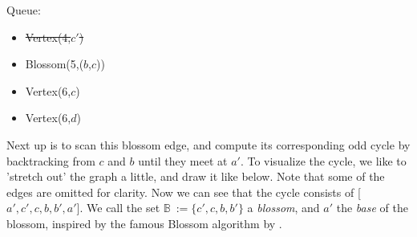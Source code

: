 \begin{minipage}{.75\linewidth}
\end{minipage}\hfill%
\begin{minipage}{.26\linewidth}
    Queue:
    \begin{itemize}
        \item \st{Vertex(4,$c'$)}
        \item Blossom(5,($b$,$c$))
        \item Vertex(6,$c$)
        \item Vertex(6,$d$)
    \end{itemize}
\end{minipage}

Next up is to scan this blossom edge, and compute its corresponding odd cycle by backtracking from $c$ and $b$ until they meet at $a'$. To visualize the cycle, we like to 'stretch out' the graph a little, and draw it like below. Note that some of the edges are omitted for clarity. Now we can see that the cycle consists of [$a',c',c,b,b',a'$]. We call the set $\mathbb{B}~:= \{c',c,b,b'\}$ a \emph{blossom}, and $a'$ the \emph{base} of the blossom, inspired by the famous Blossom algorithm by \cite{source:blossom}.

